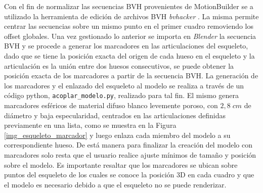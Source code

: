  Con el fin de normalizar las secuencias BVH provenientes de MotionBuilder se a utilizado la herramienta de edición de archivos BVH \textit{bvhacker} \cite{bvhacker}.
 La misma permite centrar las secuencias sobre un mismo punto en el primer cuadro removiendo los offset globales.
 Una vez gestionado lo anterior se importa en \textit{Blender} la secuencia BVH y se procede a generar los marcadores en las articulaciones del esqueleto, dado que se tiene la posición exacta del origen de cada hueso en el esqueleto y la articulación es la unión entre dos huesos consecutivos, se puede obtener la posición exacta de los marcadores a partir de la secuencia BVH.
 La generación de los marcadores y el enlazado del esqueleto al modelo se realiza a través de un código python, \texttt{acoplar\_modelo.py}, realizado para tal fin. El mismo genera marcadores esféricos de material difuso blanco levemente poroso, con $2,8 \;cm$ de diámetro y baja especularidad, centrados en las articulaciones definidas previamente en una lista, como se muestra en la Figura \ref{img_esqueleto_marcador} y luego enlaza cada miembro del modelo a su correspondiente hueso. De está manera para finalizar la creación del modelo con marcadores solo resta que el usuario realice ajuste mínimos de tamaño y posición sobre el modelo. Es importante resaltar que los marcadores se ubican sobre puntos del esqueleto de los cuales se conoce la posición 3D en cada cuadro y que el modelo es necesario debido a que el esqueleto no se puede renderizar. 
 
